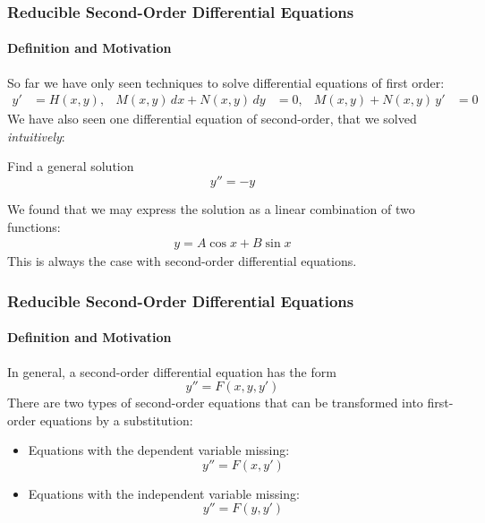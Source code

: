 \documentclass[10pt,xcolor=x11names,compress]{beamer}
\begin{document}
\begin{frame}\frametitle{Reducible Second-Order Differential Equations}
\framesubtitle{Definition and Motivation}
So far we have only seen techniques to solve differential equations of first order:
\begin{align*}
	y'&=H(x,y), &M(x,y)\,dx+N(x,y)\,dy&=0, &M(x,y) + N(x,y)\, y' &=0
\end{align*}
We have also seen one differential equation of second-order, that we solved \emph{intuitively}:
\begin{block}{Find a general solution}
\begin{equation*}
y''=-y
\end{equation*}
\end{block}
We found that we may express the solution as a linear combination of two functions:
\begin{align*}
	y=A\cos x + B\sin x
\end{align*}
This is always the case with second-order differential equations.
\end{frame}

\begin{frame}\frametitle{Reducible Second-Order Differential Equations}
\framesubtitle{Definition and Motivation}
In general, a second-order differential equation has the form
\begin{equation*}
	y''=F(x,y,y')
\end{equation*}
There are two types of second-order equations that can be transformed into first-order equations by a substitution:
\begin{itemize}
	\item Equations with the dependent variable missing:
	\begin{equation*}
		y''=F(x,y')
	\end{equation*}
	\item Equations with the independent variable missing:
	\begin{equation*}
		y''=F(y,y')
	\end{equation*}
\end{itemize}
\end{frame}
\end{document}
